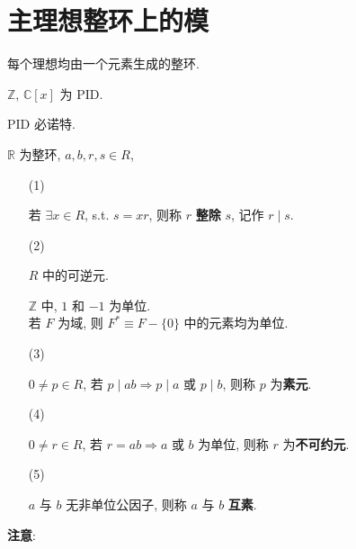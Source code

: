 \documentclass{note}
\begin{document}
\fi
\chapter{主理想整环上的模}
\begin{df}
    每个理想均由一个元素生成的整环.
\end{df}

\begin{eg}
    $\mathbb{Z}$, $\mathbb{C}[x]$ 为 PID.
\end{eg}

PID 必诺特.

$\mathbb{R}$ 为整环, $a,b,r,s\in R$,
\begin{itemize}
    \item[(1)] ~
    \begin{df}[整除]
        若 $\exists x\in R$, s.t. $s=xr$, 则称 $r$ \textbf{整除} $s$, 记作 $r\mid s$.
    \end{df}
    \item[(2)] ~
    \begin{df}[单位]
        $R$ 中的可逆元.
    \end{df}
    \begin{eg}
        $\mathbb{Z}$ 中, $1$ 和 $-1$ 为单位.\\
        若 $F$ 为域, 则 $F^*\equiv F-\{0\}$ 中的元素均为单位.
    \end{eg}
    \item[(3)] ~
    \begin{df}[素元]
        $0\neq p\in R$, 若 $p\mid ab\Longrightarrow p\mid a$ 或 $p\mid b$, 则称 $p$ 为\textbf{素元}.
    \end{df}
    \item[(4)] ~
    \begin{df}[不可约元]
        $0\neq r\in R$, 若 $r=ab\Longrightarrow a$ 或 $b$ 为单位, 则称 $r$ 为\textbf{不可约元}.
    \end{df}
    \item[(5)] ~
    \begin{df}[互素]
        $a$ 与 $b$ 无非单位公因子, 则称 $a$ 与 $b$ \textbf{互素}.
    \end{df}
\end{itemize}
\textbf{注意}:
\end{document}

